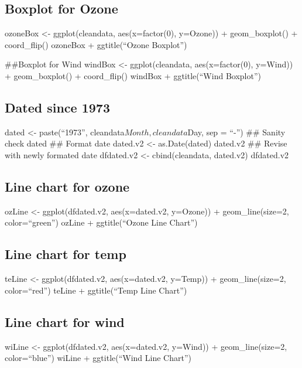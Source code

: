 \documentclass[]{article}
\begin{document}
\hypertarget{boxplot-for-ozone}{%
\subsection{Boxplot for Ozone}\label{boxplot-for-ozone}}

ozoneBox \textless{}- ggplot(cleandata, aes(x=factor(0), y=Ozone)) +
geom\_boxplot() + coord\_flip() ozoneBox + ggtitle(``Ozone Boxplot'')

\#\#Boxplot for Wind windBox \textless{}- ggplot(cleandata,
aes(x=factor(0), y=Wind)) + geom\_boxplot() + coord\_flip() windBox +
ggtitle(``Wind Boxplot'')

\hypertarget{dated-since-1973}{%
\subsection{Dated since 1973}\label{dated-since-1973}}

dated \textless{}- paste(``1973'', cleandata\(Month, cleandata\)Day, sep
= ``-'') \#\# Sanity check dated \#\# Format date dated.v2 \textless{}-
as.Date(dated) dated.v2 \#\# Revise with newly formated date dfdated.v2
\textless{}- cbind(cleandata, dated.v2) dfdated.v2

\hypertarget{line-chart-for-ozone}{%
\subsection{Line chart for ozone}\label{line-chart-for-ozone}}

ozLine \textless{}- ggplot(dfdated.v2, aes(x=dated.v2, y=Ozone)) +
geom\_line(size=2, color=``green'') ozLine + ggtitle(``Ozone Line
Chart'')

\hypertarget{line-chart-for-temp}{%
\subsection{Line chart for temp}\label{line-chart-for-temp}}

teLine \textless{}- ggplot(dfdated.v2, aes(x=dated.v2, y=Temp)) +
geom\_line(size=2, color=``red'') teLine + ggtitle(``Temp Line Chart'')

\hypertarget{line-chart-for-wind}{%
\subsection{Line chart for wind}\label{line-chart-for-wind}}

wiLine \textless{}- ggplot(dfdated.v2, aes(x=dated.v2, y=Wind)) +
geom\_line(size=2, color=``blue'') wiLine + ggtitle(``Wind Line Chart'')
\end{document}
